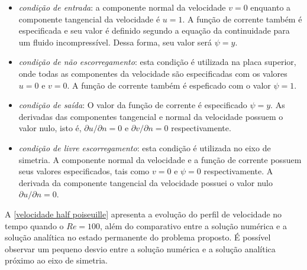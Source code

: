 \begin{itemize}
     \item \textit{condição de entrada}:
      a componente normal da velocidade $v=0$ enquanto a componente tangencial da velocidade é $u = 1$.                 
      A função de corrente também é especificada e seu valor é definido segundo a equação da continuidade  
      para um fluido incompressível. Dessa forma, seu valor será $\psi = y$.

     \item \textit{condição de não escorregamento}: esta condição é utilizada na placa superior, 
      onde todas as componentes da velocidade são especificadas    
      com os valores $u=0$ e $v=0$.                       
      A função de corrente também é espeficado com o valor $\psi=1$.               
      
     \item \textit{condição de saída}: O valor da função de corrente é especificado $\psi=y$. As derivadas das 
     componentes tangencial e normal da velocidade possuem o 
     valor nulo, isto é,
      $\partial u/\partial n = 0$ e
      $\partial v/\partial n = 0$ respectivamente.   

     \item \textit{condição de livre escorregamento}: esta condição é utilizada no eixo de simetria.
      A componente normal da velocidade e a função de corrente possuem seus valores especificados,
      tais como $v=0$ e $\psi=0$ respectivamente. A derivada da componente tangencial da velocidade
      possuei o valor nulo $\partial u/\partial n = 0$.
\end{itemize}

\medskip
A \ref{velocidade half poiseuille} apresenta a evolução 
do perfil de velocidade no tempo quando o $Re=100$, além do comparativo
entre a solução numérica e a solução analítica no estado permanente do
problema proposto. É possível observar um pequeno desvio entre a solução numérica
e a solução analítica próximo ao eixo de simetria. 

